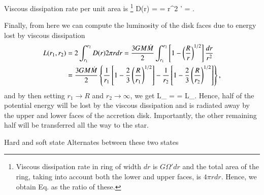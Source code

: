 Viscous dissipation rate per unit area is%
\footnote{Viscous dissipation rate in ring of width $dr$ is $G \Omega' dr$ and the total area of the ring, taking into account both the lower and upper faces, is $4\pi r dr$. Hence, we obtain Eq.  as the ratio of these.
}
\be\label{eq:D}
D(r) =  =  \nu \Sigma r^2 \Omega' =  .
\ee

Finally, from here we can compute the luminosity of the disk faces due to energy lost by viscous dissipation
\begin{align}\begin{split}
    L(r_1, r_2)  &= 2 \int_{r_1}^{r_2} D(r) 2\pi r dr = \frac{3 G M \dot{M}}{2} \int_{r_1}^{r_2} \left[ 1 - \left( \frac{R}{r} \right)^{1/2} \right] \frac{dr}{r^2} \\
 & = \frac{3 G M \dot{M}}{2} \left\{ \frac{1}{r_1} \left[ 1 - \frac{2}{3}\left( \frac{R}{r_1} \right)^{1/2} \right] -  \frac{1}{r_2} \left[ 1 - \frac{2}{3}\left( \frac{R}{r_2} \right)^{1/2} \right] \right\}, 
\end{split}\end{align}
and by then setting $r_1 \rightarrow R$ and $r_2 \rightarrow \infty$, we get
\be
L_{} =  =  L_{}.
\ee
Hence, half of the potential energy will be lost by the viscous dissipation and is radiated away by the upper and lower faces of the accretion disk.
Importantly, the other remaining half will be transferred all the way to the star.


%



Hard and soft state \cite{HvdK89}
Alternates between these two states \cite{MDF14} \cite{DGK07}




